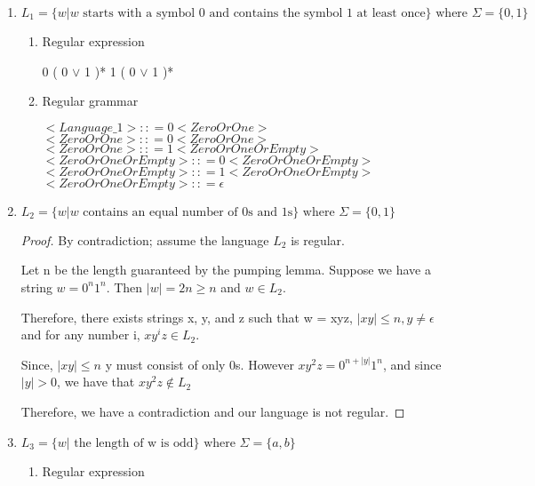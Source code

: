 \begin{enumerate}
	\item\(L_1 = \{ w | w \text{ starts with a symbol 0 and contains the symbol 1 at least once} \} \text{ where } \Sigma = \{ 0, 1 \} \)
	
	\begin{enumerate}
		\item{Regular expression}
				
		0 ( 0 \(\vee\) 1 )* 1 ( 0 \(\vee\) 1 )*		
				
		\item{Regular grammar}
		
		\( <Language\_1> :: = 0 <ZeroOrOne> \) \\
		\( <ZeroOrOne>   :: = 0 <ZeroOrOne> \) \\
		\( <ZeroOrOne>   :: = 1 <ZeroOrOneOrEmpty> \) \\
		\( <ZeroOrOneOrEmpty> :: = 0 <ZeroOrOneOrEmpty> \) \\
		\( <ZeroOrOneOrEmpty> :: = 1 <ZeroOrOneOrEmpty> \) \\
		\( <ZeroOrOneOrEmpty> :: = \epsilon \)
	\end{enumerate}
	
	\item\(L_2 = \{ w | w \text{ contains an equal number of 0s and 1s} \} \text{ where } \Sigma = \{ 0, 1 \} \)
	
	\begin{proof}
	By contradiction; assume the language \(L_2\) is regular. 
	
	Let n be the length guaranteed by the pumping lemma. Suppose we have a string \( w = 0^n 1^n \).  Then \( | w | = 2 n \geq n \) and \( w \in L_2 \).  
	
	Therefore, there exists strings x, y, and z such that w = xyz, \( | xy | \leq n, y \neq \epsilon \) and for any number i, \( xy^iz \in L_2 \). 
	
	Since, \( | x y | \leq n \) y must consist of only 0s.  However \(xy^2z = 0^{n + |y|}1^n \), and since \( |y| > 0 \), we have that \(xy^2z \notin L_2 \)
	
	Therefore, we have a contradiction and our language is not regular.
	\end{proof}
	
	\item\(L_3 = \{ w | \text{ the length of w is odd} \} \text{ where } \Sigma = \{ a, b \} \)
	
	\begin{enumerate}
		\item{Regular expression}
		

\end{enumerate}
\end{enumerate}
